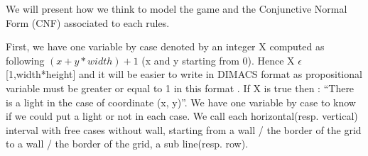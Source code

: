 \documentclass[a4paper]{article}
\begin{document}
\begin{center}
We will present how we think to model the game and the Conjunctive Normal Form (CNF) associated to each rules.
\end{center}

First, we have one variable by case denoted by an integer X computed as following $(x+y*width)+1$ (x and y starting from 0). Hence X $ \epsilon $ [1,width*height] and it will be easier to write in DIMACS format as propositional variable must be greater or equal to 1 in this format . If X is true then : “There is a light in the case of coordinate (x, y)”. We have one variable by case to know if we could put a light or not in each case.
We call each horizontal(resp. vertical) interval with free cases without wall, starting from a wall / the border of the grid to a wall / the border of the grid, a sub line(resp. row).
\end{document}
